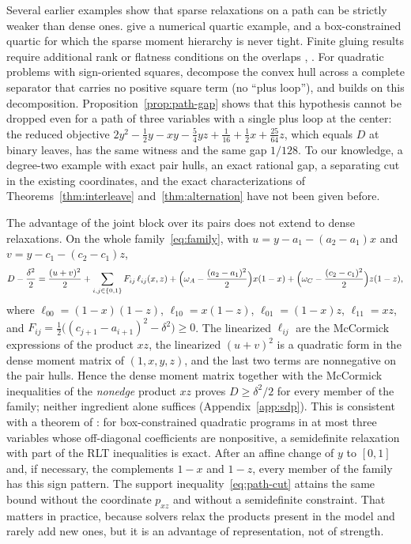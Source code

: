Several earlier examples show that sparse relaxations on a path can be
strictly weaker than dense ones. \citet[Example~3.5]{NieDemmel2009} give a
numerical quartic example, and \citet[Example~6.7]{NieQuTangZhang2026} a
box-constrained quartic for which the sparse moment hierarchy is never
tight. Finite gluing results require additional rank or flatness
conditions on the overlaps \citep[Theorem~3.7]{Lasserre2006},
\citep{FantuzziFuentes2025}. For quadratic problems with sign-oriented
squares, \citet[Corollary~1]{DeyKhajavirad2025} decompose the convex hull
across a complete separator that carries no positive square term (no
``plus loop''), and \citet{Khajavirad2026} builds on this decomposition.
Proposition~\ref{prop:path-gap} shows that this hypothesis cannot be
dropped even for a path of three variables with a single plus loop at the
center: the reduced objective
$2y^2-\tfrac12y-xy-\tfrac54yz+\tfrac1{16}+\tfrac12x+\tfrac{25}{64}z$, which
equals $D$ at binary leaves, has the same witness and the same gap
$1/128$. To our knowledge, a degree-two example with exact pair hulls, an
exact rational gap, a separating cut in the existing coordinates, and the
exact characterizations of Theorems~\ref{thm:interleave}
and~\ref{thm:alternation} have not been given before.

The advantage of the joint block over its pairs does not extend to dense
relaxations. On the whole family~\eqref{eq:family}, with $u=y-a_1-(a_2-a_1)x$
and $v=y-c_1-(c_2-c_1)z$,
\begin{equation}\label{eq:sdp-identity}
D-\frac{\delta^2}2=\frac{(u+v)^2}2+\sum_{i,j\in\{0,1\}}F_{ij}\,\ell_{ij}(x,z)
+\Bigl(\omega_A-\frac{(a_2-a_1)^2}2\Bigr)x(1-x)+\Bigl(\omega_C-\frac{(c_2-c_1)^2}2\Bigr)z(1-z),
\end{equation}
where $\ell_{00}=(1-x)(1-z)$, $\ell_{10}=x(1-z)$, $\ell_{01}=(1-x)z$,
$\ell_{11}=xz$, and $F_{ij}=\tfrac12\bigl((c_{j+1}-a_{i+1})^2-\delta^2\bigr)\ge0$.
The linearized $\ell_{ij}$ are the McCormick expressions of the product
$xz$, the linearized $(u+v)^2$ is a quadratic form in the dense moment
matrix of $(1,x,y,z)$, and the last two terms are nonnegative on the pair
hulls. Hence the dense moment matrix together with the McCormick
inequalities of the \emph{nonedge} product $xz$ proves $D\ge\delta^2/2$ for
every member of the family; neither ingredient alone suffices
(Appendix~\ref{app:sdp}). This is consistent with a theorem of
\citet[Theorem~1]{BurerNatarajanWillemsen2025}: for box-constrained
quadratic programs in at most three variables whose off-diagonal
coefficients are nonpositive, a semidefinite relaxation with part of the
RLT inequalities is exact. After an affine change of $y$ to $[0,1]$ and,
if necessary, the complements $1-x$ and $1-z$, every member of the family
has this sign pattern. The support
inequality~\eqref{eq:path-cut} attains the same bound without the
coordinate $p_{xz}$ and without a semidefinite constraint. That matters in
practice, because solvers relax the products present in the model and
rarely add new ones, but it is an advantage of representation, not of
strength.

